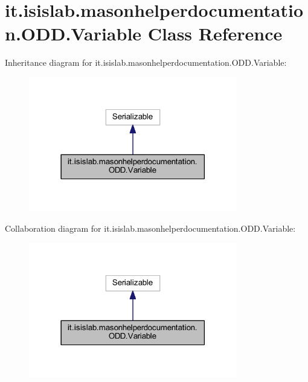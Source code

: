 \hypertarget{classit_1_1isislab_1_1masonhelperdocumentation_1_1_o_d_d_1_1_variable}{\section{it.\-isislab.\-masonhelperdocumentation.\-O\-D\-D.\-Variable Class Reference}
\label{classit_1_1isislab_1_1masonhelperdocumentation_1_1_o_d_d_1_1_variable}
}


Inheritance diagram for it.\-isislab.\-masonhelperdocumentation.\-O\-D\-D.\-Variable\-:\nopagebreak
\begin{figure}[H]
\begin{center}
\leavevmode
\includegraphics[width=258pt]{classit_1_1isislab_1_1masonhelperdocumentation_1_1_o_d_d_1_1_variable__inherit__graph}
\end{center}
\end{figure}


Collaboration diagram for it.\-isislab.\-masonhelperdocumentation.\-O\-D\-D.\-Variable\-:\nopagebreak
\begin{figure}[H]
\begin{center}
\leavevmode
\includegraphics[width=258pt]{classit_1_1isislab_1_1masonhelperdocumentation_1_1_o_d_d_1_1_variable__coll__graph}
\end{center}
\end{figure}
